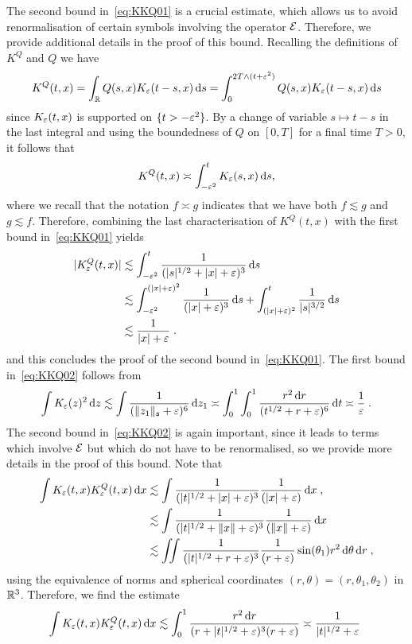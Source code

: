 \documentclass[reqno,11pt]{article}
\def\KQ{K^Q}
\def\fraks{\mathfrak{s}}
\begin{document}
The second bound in~\eqref{eq:KKQ01} is a crucial estimate, 
which allows us to avoid renormalisation of certain symbols involving the 
operator ${\mathcal E}$. Therefore, we provide additional details in the proof of 
this bound. Recalling the definitions of $K^Q$ and $Q$ we have 
\[
K^Q(t,x)=\int_{\mathbb{R}} Q(s,x)K_\varepsilon(t-s,x)\operatorname{d}\!s = \int_0^{2T\wedge (t+\varepsilon^2)} 
Q(s,x)K_\varepsilon(t-s,x)\operatorname{d}\!s
\]
since $K_\varepsilon(t,x)$ is supported on $\{t>-\varepsilon^2\}$. By a change of
variable $s\mapsto t-s$ in the last integral and using the boundedness of $Q$ on $[0,T]$
for a final time $T>0$, it follows that 
\[
K^Q(t,x)\asymp  \int_{-\varepsilon^2}^{t} K_\varepsilon(s,x)\operatorname{d}\!s,
\]
where we recall that the notation $f\asymp g$ indicates that we have both 
$f\lesssim g$ and $g\lesssim f$. Therefore, combining the last characterisation 
of $K^Q(t,x)$ with the first bound in~\eqref{eq:KKQ01} yields
\begin{align}
\nonumber
\abs{\KQ_\eps(t,x)} 
 &\lesssim \int_{-\eps^2}^t \frac{1}{(\abs{s}^{1/2}+\abs{x}+\eps)^{3}} \6s \\
\nonumber
 &\lesssim \int_{-\eps^2}^{(\abs{x}+\eps)^2}
 \frac{1}{(\abs{x}+\eps)^{3}} \6s
 + \int_{(\abs{x}+\eps)^2}^t \frac{1}{\abs{s}^{3/2}} \6s \\
 &\lesssim \frac{1}{\abs{x}+\eps}\;.
 \nonumber
\end{align} 
and this concludes the proof of the second bound in~\eqref{eq:KKQ01}.
The first bound in~\eqref{eq:KKQ02} follows from 
\[
 \int K_\eps(z)^2 \6z 
 \lesssim \int \frac{1}{(\norm{z_1}_\fraks+\eps)^6}\6z_1 
\asymp \int_0^1 \int_0^1 \frac{r^2\6r}{(t^{1/2}+r+\eps)^6} \6t 
\asymp \frac{1}{\eps}\;. 
\]
The second bound in~\eqref{eq:KKQ02} is again important, since it leads to
terms which involve ${\mathcal E}$ but which do not have to be renormalised, so we
provide more details in the proof of this bound. Note that 
\begin{align*}
 \int K_\eps(t,x)\KQ_\eps(t,x) \6x 
 &\lesssim \int \frac{1}{(|t|^{1/2}+|x|+\eps)^3}\frac{1}{(|x|+\eps)} \6 x\;, \\
 &\lesssim \int \frac{1}{(|t|^{1/2}+\|x\|+\eps)^3}\frac{1}{(\|x\|+\eps)} \6 x\; \\
 &\lesssim \iint \frac{1}{(|t|^{1/2}+r+\eps)^3}\frac{1}{(r+\eps)} \sin(\theta_1)
r^2 \6 \theta\6 r   \;,
\end{align*}
using the equivalence of norms and spherical coordinates $(r,\theta)=(r,\theta_1,\theta_2)$
in $\mathbb{R}^3$. Therefore, we find the estimate 
\[
 \int K_\eps(t,x)\KQ_\eps(t,x) \6x 
 \lesssim \int_0^1 \frac{r^2\6r}{(r+\abs{t}^{1/2}+\eps)^3(r+\eps)}
 \asymp \frac{1}{\abs{t}^{1/2}+\eps}\; 
\]
\end{document}
